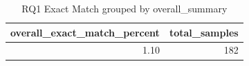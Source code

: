 \begin{table}
\caption{RQ1 Exact Match grouped by overall_summary}
\label{tab:rq1_overall_summary}
\begin{tabular}{rr}
\toprule
overall_exact_match_percent & total_samples \\
\midrule
1.10 & 182 \\
\bottomrule
\end{tabular}
\end{table}
